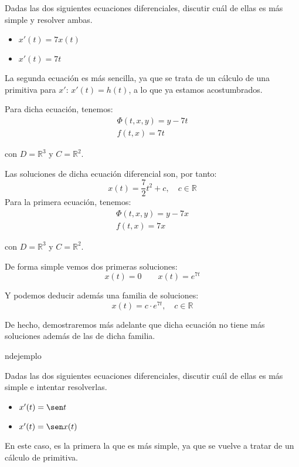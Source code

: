 \begin{ejemplo}
    Dadas las dos siguientes ecuaciones diferenciales, discutir cuál de ellas es más simple y resolver ambas.
    \begin{itemize}
        \item $x'(t) = 7x(t)$
        \item $x'(t) = 7t$
    \end{itemize}
    La segunda ecuación es más sencilla, ya que se trata de un cálculo de una primitiva para $x'$: $x'(t) = h(t)$, a lo que ya estamos acostumbrados.

    Para dicha ecuación, tenemos:
    \begin{gather*}
        \Phi(t,x,y) = y-7t \\
        f(t,x) = 7t
    \end{gather*}

    con $D=\mathbb{R}^3$ y $C=\mathbb{R}^2$.

    Las soluciones de dicha ecuación diferencial son, por tanto:
    \begin{equation*}
        x(t) = \frac{7}{2} t^2 + c, \quad c\in \mathbb{R}
    \end{equation*}
    Para la primera ecuación, tenemos:
    \begin{gather*}
        \Phi(t,x,y) = y-7x \\
        f(t,x) = 7x
    \end{gather*}

    con $D=\mathbb{R}^3$ y $C=\mathbb{R}^2$.

    De forma simple vemos dos primeras soluciones:
    \begin{equation*}
        x(t) = 0 \qquad  x(t) = e^{7t}
    \end{equation*}

    Y podemos deducir además una familia de soluciones:
    \begin{equation*}
        x(t) = c \cdot e^{7t}, \quad c\in \mathbb{R}
    \end{equation*}

    De hecho, demostraremos más adelante que dicha ecuación no tiene más soluciones además de las de dicha familia.

\e nd{ejemplo}
   
\begin{ejemplo}
    Dadas las dos siguientes ecuaciones diferenciales, discutir cuál de ellas es más simple e intentar resolverlas.
    \begin{itemize}
        \item $x'(t) = \sen t$
        \item $x'(t) = \sen x(t)$
    \end{itemize}
    En este caso, es la primera la que es más simple, ya que se vuelve a tratar de un cálculo de primitiva.


\end{ejemplo}
\end{ejemplo}

